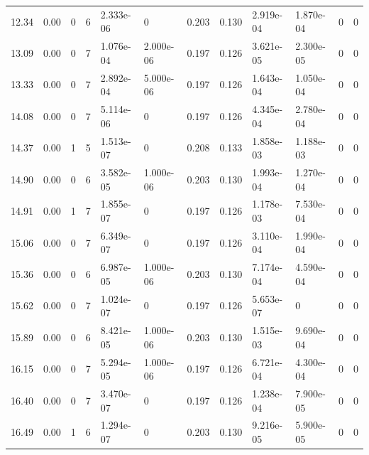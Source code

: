 \documentclass[preview]{standalone}
\begin{document}
{{\begin{tabular}{L{1.2cm}C{1.2cm} C{0.3cm}C{0.5cm} C{1.4cm}C{1.4cm} C{1.4cm}C{1.4cm} C{1.6cm}C{1.6cm} C{1.6cm}C{1.6cm}}
  12.34  &  0.00  & 0     &  6 &  2.333e-06  & 0  &  0.203&   0.130& 2.919e-04 & 1.870e-04   &  0 & 0  \\ 
  13.09  &  0.00  & 0     &  7 &  1.076e-04  & 2.000e-06  &  0.197&   0.126& 3.621e-05 & 2.300e-05   &  0 & 0  \\ 
  13.33  &  0.00  & 0     &  7 &  2.892e-04  & 5.000e-06  &  0.197&   0.126& 1.643e-04 & 1.050e-04   &  0 & 0  \\ 
  14.08  &  0.00  & 0     &  7 &  5.114e-06  & 0  &  0.197&   0.126& 4.345e-04 & 2.780e-04   &  0 & 0  \\ 
  14.37  &  0.00  & 1     &  5 &  1.513e-07  & 0  &  0.208&   0.133& 1.858e-03 & 1.188e-03   &  0 & 0  \\ 
  14.90  &  0.00  & 0     &  6 &  3.582e-05  & 1.000e-06  &  0.203&   0.130& 1.993e-04 & 1.270e-04   &  0 & 0  \\ 
  14.91  &  0.00  & 1     &  7 &  1.855e-07  & 0  &  0.197&   0.126& 1.178e-03 & 7.530e-04   &  0 & 0  \\ 
  15.06  &  0.00  & 0     &  7 &  6.349e-07  & 0  &  0.197&   0.126& 3.110e-04 & 1.990e-04   &  0 & 0  \\ 
  15.36  &  0.00  & 0     &  6 &  6.987e-05  & 1.000e-06  &  0.203&   0.130& 7.174e-04 & 4.590e-04   &  0 & 0  \\ 
  15.62  &  0.00  & 0     &  7 &  1.024e-07  & 0  &  0.197&   0.126& 5.653e-07 & 0   &  0 & 0  \\ 
  15.89  &  0.00  & 0     &  6 &  8.421e-05  & 1.000e-06  &  0.203&   0.130& 1.515e-03 & 9.690e-04   &  0 & 0  \\ 
  16.15  &  0.00  & 0     &  7 &  5.294e-05  & 1.000e-06  &  0.197&   0.126& 6.721e-04 & 4.300e-04   &  0 & 0  \\ 
  16.40  &  0.00  & 0     &  7 &  3.470e-07  & 0  &  0.197&   0.126& 1.238e-04 & 7.900e-05   &  0 & 0  \\ 
  16.49  &  0.00  & 1     &  6 &  1.294e-07  & 0  &  0.203&   0.130& 9.216e-05 & 5.900e-05   &  0 & 0  \\ 
\hline 
\end{tabular} 

}}
\end{document}
